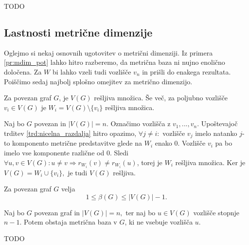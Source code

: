 \documentclass[mat1, tisk]{fmfdelo}
\newcommand{\1}{(1, 1, ..., 1)}
\newcommand{\2}{(2, 2, ..., 2)}
\begin{document}
\begin{dokaz}
    TODO
\end{dokaz}



\subsection{Lastnosti metrične dimenzije} \label{s:lastnosti_mdim}

Oglejmo si nekaj osnovnih ugotovitev o metrični dimenziji. Iz primera \ref{pr:mdim_pot}
lahko hitro razberemo, da metrična baza ni nujno enolično določena. Za $W$ bi lahko 
vzeli tudi vozlišče $v_n$ in prišli do enakega rezultata. 
Poiščimo sedaj najbolj splošno omejitev za metrično dimenzijo.

\begin{trditev} \label{trd:cela_resljiva}
Za povezan graf $G$, je $V(G)$ rešljiva množica. Še več, za poljubno vozlišče $v_i \in V(G)$
je $W_i = V(G) \setminus \{ v_i\}$ rešljiva množica.
\end{trditev}

\begin{dokaz}
Naj bo $G$ povezan in $|V(G)|= n$. Označimo vozlišča z $v_1, ..., v_n$.
Upoštevajoč trditev \ref{trd:nicelna_razdalja} hitro opazimo, 
$\forall j \neq i:$ vozlišče $v_j$ imelo natanko $j$-to komponento metrične predstavitve 
glede na $W_i$ enako $0$. Vozlišče $v_i$ pa bo imelo vse komponente različne od $0.$
Sledi $\forall u, v \in V(G): u \neq v \Rightarrow r_{W_i}(v) \neq r_{W_i}(u)$, 
torej je $W_i$ rešljiva množica.
Ker je $V(G) = W_i \cup \{ v_i\},$ je tudi $V(G)$ rešljiva.
\end{dokaz}


\begin{posledica} \label{po:groba_omejitev_mdim}
    Za povezan graf $G$ velja 
    $$1 \leq \beta(G) \leq |V(G)| - 1. $$
\end{posledica}


\begin{lema} \label{lema:vozlisce_max_deg}
    Naj bo $G$ povezan graf in $|V(G)| = n,$ ter naj bo $u \in V(G)$ vozlišče stopnje $n-1.$
    Potem obstaja metrična baza v $G$, ki ne vsebuje vozlišča $u.$
\end{lema}

\begin{dokaz}
    TODO
\end{dokaz}
\end{document}
